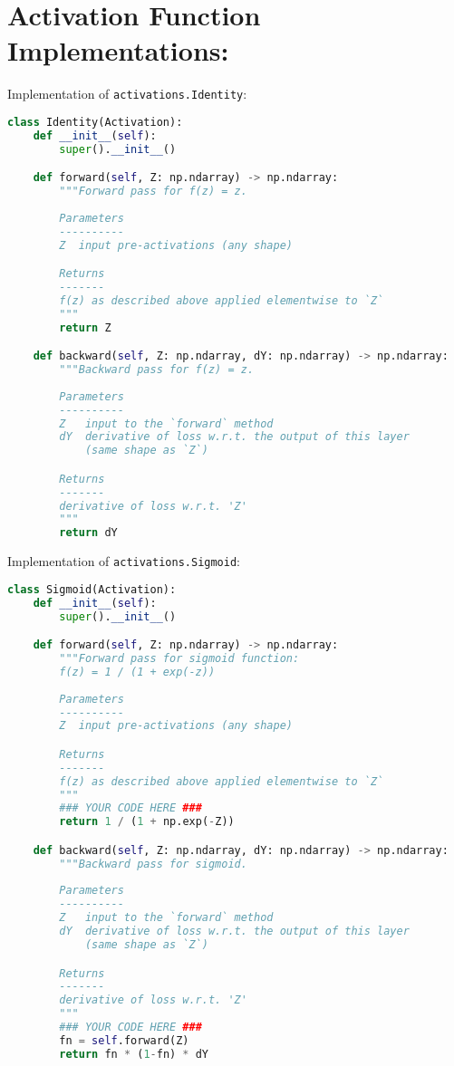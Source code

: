 \section{Activation Function Implementations:}

Implementation of \texttt{activations.Identity}:

\begin{lstlisting}[language=Python]
class Identity(Activation):
    def __init__(self):
        super().__init__()

    def forward(self, Z: np.ndarray) -> np.ndarray:
        """Forward pass for f(z) = z.
        
        Parameters
        ----------
        Z  input pre-activations (any shape)

        Returns
        -------
        f(z) as described above applied elementwise to `Z`
        """
        return Z

    def backward(self, Z: np.ndarray, dY: np.ndarray) -> np.ndarray:
        """Backward pass for f(z) = z.
        
        Parameters
        ----------
        Z   input to the `forward` method
        dY  derivative of loss w.r.t. the output of this layer
            (same shape as `Z`)

        Returns
        -------
        derivative of loss w.r.t. 'Z'
        """
        return dY

\end{lstlisting}

Implementation of \texttt{activations.Sigmoid}:

\begin{lstlisting}[language=Python]
class Sigmoid(Activation):
    def __init__(self):
        super().__init__()

    def forward(self, Z: np.ndarray) -> np.ndarray:
        """Forward pass for sigmoid function:
        f(z) = 1 / (1 + exp(-z))
        
        Parameters
        ----------
        Z  input pre-activations (any shape)

        Returns
        -------
        f(z) as described above applied elementwise to `Z`
        """
        ### YOUR CODE HERE ###
        return 1 / (1 + np.exp(-Z))

    def backward(self, Z: np.ndarray, dY: np.ndarray) -> np.ndarray:
        """Backward pass for sigmoid.
        
        Parameters
        ----------
        Z   input to the `forward` method
        dY  derivative of loss w.r.t. the output of this layer
            (same shape as `Z`)

        Returns
        -------
        derivative of loss w.r.t. 'Z'
        """
        ### YOUR CODE HERE ###
        fn = self.forward(Z)
        return fn * (1-fn) * dY

\end{lstlisting}

